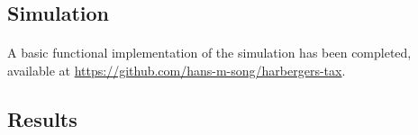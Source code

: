 \subsection{Simulation}

\paragraph{} A basic functional implementation of the simulation has been completed, available at \url{https://github.com/hans-m-song/harbergers-tax}. 

\begin{algorithm}
  \begin{algorithmic}[1]
     
          \EndIf
        \EndFor
      \EndFor
    \EndProcedure
  \end{algorithmic}
\end{algorithm}

\subsection{Results}
 